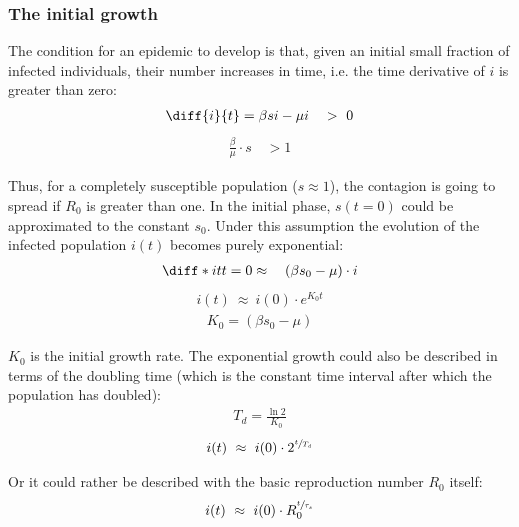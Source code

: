 \documentclass[DIV=12, BCOR=0pt]{scrartcl}  %
\begin{document}
  \subsubsection{The initial growth}
  The condition for an epidemic to develop is that, given an initial small fraction of infected individuals, their number increases in time, i.e. the time derivative of $i$ is greater than zero:
  \begin{align}
  	\diff{i}{t} = \beta s i - \mu i \quad > \ 0 
  	\label{sir_growthCond}
  \end{align}
  \begin{align} %
  	\frac{\beta }{\mu} \cdot s \quad > 1  %
  	\label{eq:sir_growthReq}
  \end{align}
  
  Thus, for a completely susceptible population ($s \approx 1$), the contagion is going to spread if $R_0$ is greater than one. In the initial phase, $s(t=0)$ could be approximated to the constant $s_0$.
  Under this assumption the evolution of the infected population $i(t)$ becomes purely exponential:
  \begin{align}
  	\diff*{i}{t}{t=0} \approx \quad (\beta s_0 - \mu) \cdot i 
  	\label{eq:sir_approxi}
  \end{align}
  \begin{align} %
  	i(t) \ \approx \ i(0) \cdot e^{K_0 t} 
  	\label{eq:sir_growthK0}
  \end{align}
  \begin{align} %
  	K_0 = (\beta s_0 - \mu)
  	\label{eq:sir_K0}
  \end{align}
	
	$K_0$ is the initial growth rate. The exponential growth could also be described in terms of the doubling time (which is the constant time interval after which the population has doubled):
	\begin{align}
		T_{d} = \frac{\ln 2}{K_0}
		\label{eq:doubling} 
	\end{align}
	\begin{align}
		i(t) \ \approx \ i(0) \cdot 2^{\sfrac{t}{T_{d}}}
		\label{eq:sir_growthTd} 
	\end{align}

	Or it could rather be described with the basic reproduction number $R_0$ itself:
	\begin{align}
		i(t) \ \approx \ i(0) \cdot R_0^{\sfrac{t}{\tau_s}}
		\label{eq:sir_growthR0}
	\end{align}
\end{document}
